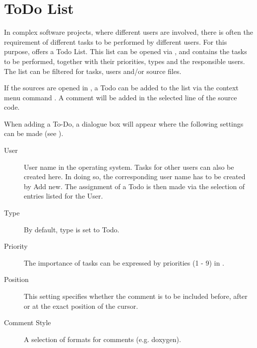 \section{ToDo List}\label{sec:todo_list}

In complex software projects, where different users are involved, there is often the requirement of different tasks to be performed by different users. For this purpose, \codeblocks offers a Todo List. This list can be opened via , and contains the tasks to be performed, together with their priorities, types and the responsible users. The list can be filtered for tasks, users and/or source files.



If the sources are opened in \codeblocks, a Todo can be added to the list via the context menu command . A comment will be added in the selected line of the source code.


When adding a To-Do, a dialogue box will appear where the following settings can be made (see ).


\begin{description}
\item[User] User name  in the operating system. Tasks for other users can also be created here. In doing so, the corresponding user name has to be created by Add new. The assignment of a Todo is then made via the selection of entries listed for the User.

\item[Type] By default, type is set to Todo.
\item[Priority] The importance of tasks can be expressed by priorities (1 - 9) in \codeblocks.
\item[Position] This setting specifies whether the comment is to be included before, after or at the exact position of the cursor.
\item[Comment Style] A selection of formats for comments (e.g. doxygen).
\end{description}

